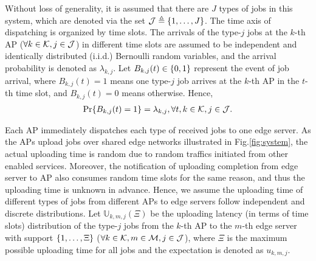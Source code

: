 Without loss of generality, it is assumed that there are $J$ types of jobs in this system, which are denoted via the set $\mathcal{J} \triangleq \{1,\dots,J\}$.
The time axis of dispatching is organized by time slots.
The arrivals of the type-$j$ jobs at the $k$-th AP ($\forall k\in\mathcal{K},j\in\mathcal{J}$) in different time slots are assumed to be independent and identically distributed (i.i.d.) Bernoulli random variables, and the arrival probability is denoted as $\lambda_{k,j}$.
Let $B_{k,j}(t) \in \{0,1\}$ represent the event of job arrival, where $B_{k,j}(t)=1$ means one type-$j$ job arrives at the $k$-th AP in the $t$-th time slot, and $B_{k,j}(t)=0$ means otherwise.
Hence,
\begin{align}
    \Pr\{ B_{k,j}(t) = 1 \} = \lambda_{k,j}, \forall t,k\in\mathcal{K},j\in\mathcal{J}.
\end{align}

Each AP immediately dispatches each type of received jobs to one edge server.
As the APs upload jobs over shared edge networks illustrated in Fig.\ref{fig:system}, the actual uploading time is random due to random traffics initiated from other enabled services.
Moreover, the notification of uploading completion from edge server to AP also consumes random time slots for the same reason, and thus the uploading time is unknown in advance.
Hence, we assume the uploading time of different types of jobs from different APs to edge servers follow independent and discrete distributions.
Let $\mathbb{U}_{k,m,j}(\Xi)$ be the uploading latency (in terms of time slots) distribution of the type-$j$ jobs from the $k$-th AP to the $m$-th edge server with support $\{1, \dots, \Xi\}$ ($\forall k\in\mathcal{K}, m\in\mathcal{M}, j\in\mathcal{J}$), where $\Xi$ is the maximum possible uploading time for all jobs and the expectation is denoted as $u_{k,m,j}$.


